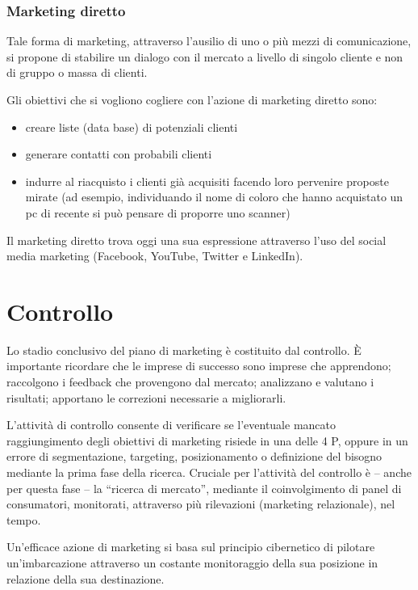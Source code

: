 \subsection{Marketing diretto}
Tale forma di marketing, attraverso l’ausilio di uno o più mezzi di comunicazione, si propone di stabilire un dialogo con il mercato a livello di singolo cliente e non di gruppo o massa di clienti.

Gli obiettivi che si vogliono cogliere con l’azione di marketing diretto sono:
\begin{itemize}
	\item creare liste (data base) di potenziali clienti
	\item generare contatti con probabili clienti
	\item indurre al riacquisto i clienti già acquisiti facendo loro pervenire proposte mirate (ad esempio, individuando il nome di coloro che hanno acquistato un pc di recente si può pensare di proporre uno scanner)
\end{itemize}
Il marketing diretto trova oggi una sua espressione attraverso l’uso del social media marketing (Facebook, YouTube, Twitter e LinkedIn).

\chapter{Controllo}
Lo stadio conclusivo del piano di marketing è costituito dal controllo. È importante ricordare che le imprese di successo sono
imprese che apprendono; raccolgono i feedback che provengono dal mercato; analizzano e valutano i risultati; apportano le correzioni necessarie a migliorarli.

L’attività di controllo consente di verificare se l’eventuale mancato raggiungimento degli obiettivi di marketing risiede in una delle 4
P, oppure in un errore di segmentazione, targeting, posizionamento o definizione del bisogno mediante la prima fase della ricerca.
Cruciale per l’attività del controllo è – anche per questa fase – la “ricerca di mercato”, mediante il coinvolgimento
di panel di consumatori, monitorati, attraverso più rilevazioni (marketing relazionale), nel tempo.

Un’efficace azione di marketing si basa sul principio cibernetico di pilotare un’imbarcazione attraverso un costante monitoraggio della sua posizione in relazione della sua destinazione.































